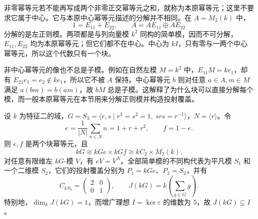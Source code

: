 \ProseParagraphBreak

非零幂等元若不能再写成两个非零正交幂等元之和，就称为本原幂等元；这里不要求它属于中心。它与本原中心幂等元描述的分解并不相同。在 \(A=M_2(k)\) 中，
\[
	1=E_{11}+E_{22},\qquad A=AE_{11}\oplus AE_{22}
\]
分解的是左正则模。两项都是与列向量模 \(k^2\) 同构的简单模，因而不可分解，\(E_{11},E_{22}\) 均为本原幂等元；但它们都不在中心。中心为 \(kI\)，只有零与一两个中心幂等元，所以这个代数只有一个块。

\ProseParagraphBreak

非中心幂等元的像也不总是子模。例如在自然左模 \(M=k^2\) 中，\(E_{11}M=ke_1\)，却有 \(E_{21}e_1=e_2\notin ke_1\)，所以它不被 \(A\) 保持。中心幂等元 \(b\) 则对任意 \(a\in A,m\in M\) 满足 \(a(bm)=b(am)\)，故 \(bM\) 总是子模。这解释了为什么块可以直接分解每个模，而一般本原幂等元在本节用来分解正则模并构造投射覆盖。
\begin{example}\label{b5:exm:s3-two-blocks}
	设 \(k\) 为特征二的域，\(G=S_3=\langle r,s\mid r^3=s^2=1,\ srs=r^{-1}\rangle\)，\(N=\langle r\rangle\)。令
	\[
		e=\frac1{|N|}\sum_{n\in N}n=1+r+r^2, \qquad f=1-e.
	\]
	则 \(e,f\) 是两个块幂等元，且
	\[
		kG\cong kGe\times kGf\cong kC_2\times M_2(k).
	\]
	对任意有限维左 \(kG\)-模 \(V\)，有 \(eV=V^N\)。全部简单模的不同构代表为平凡模 \(S_1\) 和一个二维模 \(S_2\)，它们的投射覆盖分别为 \(P_1=kGe\)、\(P_2=S_2\)，并有
	\[
		C_{kS_3}=\begin{pmatrix}2&0\\0&1\end{pmatrix},
		\qquad J(kG)=k\!\left(\sum_{g\in G}g\right).
	\]
	特别地，\(\dim_kJ(kG)=1\)，而增广理想 \(I=\ker\varepsilon\) 的维数为 \(5\)，故 \(J(kG)\subsetneq I\)。
\end{example}
